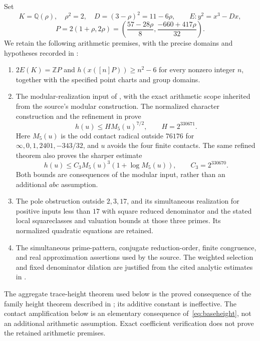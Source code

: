 \documentclass[11pt,a4paper]{article}
\newcommand{\Q}{\mathbb Q}\newcommand{\Z}{\mathbb Z}\newcommand{\HH}{\mathcal H}
\begin{document}
Set
\[
 K=\Q(\rho),\quad \rho^2=2,\quad D=(3-\rho)^2=11-6\rho,
 \qquad E:y^2=x^3-Dx,
\]
\[
 P=2(1+\rho,2\rho)
 =\left(\frac{57-28\rho}{8},\frac{-660+417\rho}{32}\right).
\]
We retain the following arithmetic premises, with the precise domains
and hypotheses recorded in \cite{Dependencies,Source,Weights}:
\begin{enumerate}
\item $2E(K)=\Z P$ and $h(x([n]P))\ge n^2-6$ for every nonzero
integer $n$, together with the specified point charts and group domains.
\item The modular-realization input of
\cite[Definition~6.1]{NewHeight}, with the exact arithmetic scope inherited
from the source's modular construction. The normalized character construction and the refinement in
\cite[Theorem~4.1]{RefinedHeight} prove
\begin{equation}\label{eq:baseheight}
 h(u)\le H M_5(u)^{7/2},\qquad H=2^{330671}.
\end{equation}
Here $M_5(u)$ is the odd contact radical outside $76176$ for
$\infty,0,1,2401,-343/32$, and $u$ avoids the four finite contacts.
The same refined theorem also proves the sharper estimate
\begin{equation}\label{eq:baseheightsharp}
 h(u)\le C_3M_5(u)^3(1+\log M_5(u)),\qquad C_3=2^{330670}.
\end{equation}
Both bounds are consequences of the modular input, rather than an
additional $abc$ assumption.
\item The pole obstruction outside $2,3,17$, and its simultaneous
realization for positive inputs less than $17$ with square reduced
denominator and the stated local squareclasses and valuation bounds
at those three primes. Its normalized quadratic equations are retained.
\item The simultaneous prime-pattern, conjugate reduction-order,
finite congruence, and real approximation assertions used by the source.
The weighted selection and fixed denominator dilation are justified
from the cited analytic estimates in \cite{Selection}.
\end{enumerate}
The aggregate trace-height theorem used below is the proved consequence
of the family height theorem described in \cite{Aggregate}; its additive
constant is ineffective. The contact amplification below is an elementary consequence of~\eqref{eq:baseheight},
not an additional arithmetic assumption. Exact coefficient verification
does not prove the retained arithmetic premises.
\end{document}
